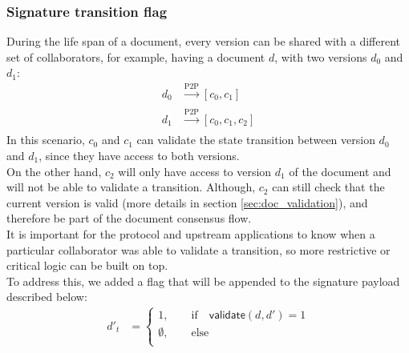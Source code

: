 \subsubsection{Signature transition flag}
During the life span of a document, every version can be shared with a different set of collaborators, for example, having a document $d$, with two versions $d_0$ and $d_1$: \\
\begin{eqnarray}
    d_0 & \xrightarrow[]{\text{P2P}} [c_0, c_1] \\
    d_1 & \xrightarrow[]{\text{P2P}} [c_0, c_1, c_2]
\end{eqnarray}
In this scenario, $c_0$ and $c_1$ can validate the state transition between version $d_0$ and $d_1$, since they have access to both versions. \\
On the other hand, $c_2$ will only have access to version $d_1$ of the document and will not be able to validate a transition. Although, $c_2$ can still check that the current version is valid (more details in section \ref{sec:doc_validation}), and therefore be part of the document consensus flow. \\
It is important for the protocol and upstream applications to know when a particular collaborator was able to validate a transition, so more restrictive or critical logic can be built on top. \\
To address this, we added a flag that will be appended to the signature payload described below:
\begin{equation}
\begin{split}
d'_{t} & =  \begin{cases}
  1, \quad \quad \text{if} \quad \mathsf{validate}(d, d')  = 1 \\      
  \emptyset,  \quad\quad\text{else} \\
\end{cases}
\end{split}
\end{equation}

